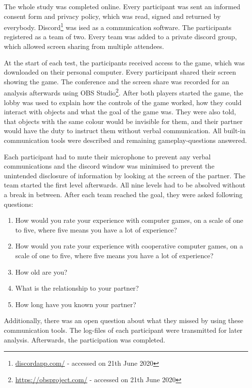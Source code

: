 The whole study was completed online.
Every participant was sent an informed consent form and privacy policy, which was read, signed and returned by everybody.
Discord\footnote{\url{discordapp.com/} - accessed on 21th June 2020} was ised as a communication software. The participants registered as a team of two. 
Every team was added to a private discord group, which allowed screen sharing from multiple attendees.

At the start of each test, the participants received access to the game, which was downloaded on their personal computer.
Every participant shared their screen showing the game. The conference and the screen share was recorded for an analysis afterwards using OBS Studio\footnote{\url{https://obsproject.com/} - accessed on 21th June 2020}.
After both players started the game, the lobby was used to explain how the controls of the game worked, how they could interact with objects and what the goal of the game was. They were also told, that objects with the same colour would be invisible for them, and their partner would have the duty to instruct them without verbal communication.
All built-in communication tools were described and remaining gameplay-questions answered.

Each participant had to mute their microphone to prevent any verbal communications and the discord window was minimised to prevent the unintended disclosure of information by looking at the screen of the partner.
The team started the first level afterwards. All nine levels had to be absolved without a break in between.
After each team reached the goal, they were asked following questions:

\begin{enumerate}
    \item How would you rate your experience with computer games, on a scale of one to five, where five means you have a lot of experience?
    \item How would you rate your experience with cooperative computer games, on a scale of one to five, where five means you have a lot of experience?
    \item How old are you?
    \item What is the relationship to your partner?
    \item How long have you known your partner?
\end{enumerate}

Additionally, there was an open question about what they missed by using these communication tools.
The log-files of each participant were transmitted for later analysis.
Afterwards, the participation was completed.

